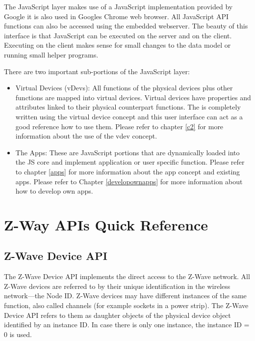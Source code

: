 The JavaScript layer makes use of a JavaScript implementation provided by Google it 
is also used in Googles Chrome web browser. All JavaScript API functions can also be 
accessed using the embedded webserver. The beauty of this interface is that JavaScript 
can be executed on the server and on the client. Executing on the client makes sense 
for small changes to the data model or running small helper programs.

There are two important sub-portions of the JavaScript layer:

\begin{itemize}

\item Virtual Devices (vDevs): All functions of the physical devices plus other functions are 
mapped into virtual devices. Virtual devices have properties and attributes linked to 
their physical counterpart functions. The \zwshui is completely 
written using the virtual device concept and this user interface can act as a good reference 
how to use them. Please refer to chapter \ref{c2} for more information about the 
use of the vdev concept.

\item The Apps: These are JavaScript portions that are dynamically loaded into the JS 
core and implement application or user specific function. Please refer to chapter \ref{apps} 
for more information about the app concept and existing apps. Please refer to Chapter 
\ref{developownapps} for more information about how to develop own apps.

\end{itemize}

\section{Z-Way APIs Quick Reference}

\subsection{Z-Wave Device API}
\label{zwavedeviceapi}

The Z-Wave Device API implements the direct access to the Z-Wave network. All Z-Wave devices 
are referred to by their unique identification in the wireless network---the Node ID. 
Z-Wave devices may have different instances of the same function, also called channels 
(for example sockets in a power strip). The Z-Wave Device API refers to them as daughter 
objects of the physical device object identified by an instance ID. In case there is 
only one instance, the instance ID = 0 is used.

